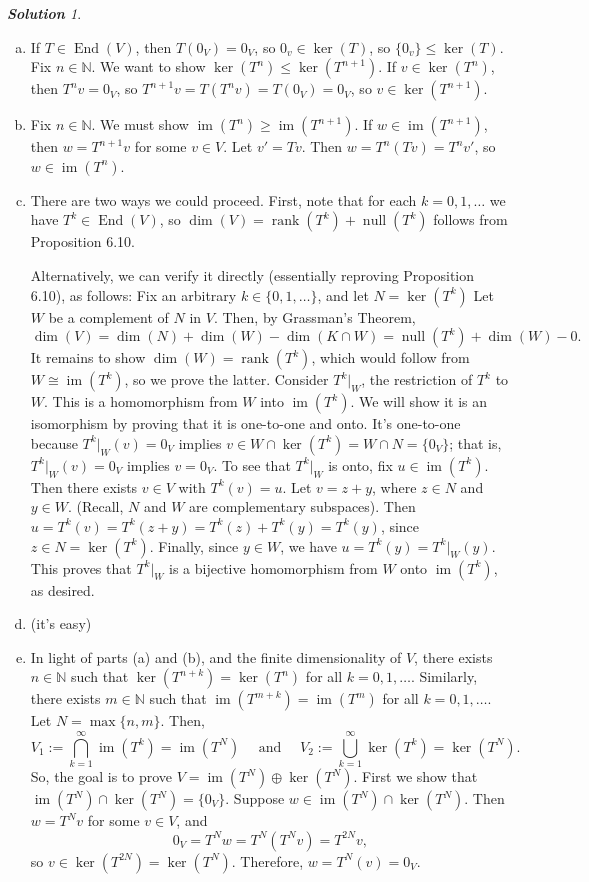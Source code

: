 \documentclass[11pt]{paper}
\theoremstyle{remark}
\newtheorem*{solution}{{\bf Solution}}
\newcommand\0{\ensuremath{\mathbf{0}}}
\newcommand{\<}{\ensuremath{\langle}}
\renewcommand{\>}{\ensuremath{\rangle}}
\newcommand\fld[1]{\ensuremath{\mathbb{#1}}}
\newcommand\N{\ensuremath{\fld{N}}}
\newcommand\End{\ensuremath{\operatorname{End}}}
\newcommand{\nulity}[1]{\ensuremath{\operatorname{null}(#1)}}
\renewcommand{\ker}[1]{\ensuremath{\operatorname{ker}(#1)}}
\renewcommand{\dim}[1]{\ensuremath{\operatorname{dim}(#1)}}
\newcommand\im[1]{\ensuremath{\operatorname{im}(#1)}}
\newcommand{\rank}[1]{\ensuremath{\operatorname{rank}(#1)}}
\renewcommand{\leq}{\ensuremath{\leqslant}}
\renewcommand{\geq}{\ensuremath{\geqslant}}
\begin{document}
\begin{solution}
  \begin{enumerate}[(a)]
  \item If $T \in \End(V)$, then $T(0_V) = 0_V$, so $0_v\in \ker{T}$, so 
    $\{0_v\}\leq \ker{T}$.  Fix $n \in \N$.  We want to show 
    $\ker{T^n} \leq \ker{T^{n+1}}$. If $v\in \ker{T^n}$, then $T^nv = 0_V$, so 
    $T^{n+1}v = T(T^nv) = T(0_V) = 0_V$, so $v\in \ker{T^{n+1}}$.
\item  Fix $n \in \N$.  We must show $\im{T^n} \geq \im{T^{n+1}}$. 
If $w \in \im{T^{n+1}}$, then $w = T^{n+1}v$ for some $v\in V$. Let $v' =  Tv$.
Then $w =  T^n (Tv) = T^nv'$, so  $w \in \im{T^n}$.

\item 
There are two ways we could proceed.
First, note that for each $k= 0, 1, \dots$ we have $T^k\in \End(V)$, so 
$\dim{V} = \rank{T^k} + \nulity{T^k}$ follows from Proposition 6.10.

Alternatively, we can verify it directly (essentially reproving
Proposition 6.10), as follows: Fix an arbitrary $k \in \{0, 1, \dots\}$, and let
$N = \ker{T^k}$  Let $W$ be a complement of $N$ in $V$.  Then, by Grassman's
Theorem,
\[
\dim{V} = \dim{N} + \dim{W}-\dim{K\cap W} = \nulity{T^k} + \dim{W} - 0.
\]
It remains to show $\dim{W} = \rank{T^k}$, which would follow from
$W \cong \im{T^k}$, so we prove the latter.  Consider $T^k|_W$, the restriction
of $T^k$ to $W$. This is a homomorphism from $W$ into $\im{T^k}$.  We will show it is an
isomorphism by proving that it is one-to-one and onto.  It's one-to-one because 
$T^k|_W(v) = 0_V$ implies $v \in W \cap \ker{T^k} =  W \cap N = \{0_V\}$;
that is, $T^k|_W(v) = 0_V$ implies $v = 0_V$. To see that $T^k|_W$ is onto, fix
$u \in \im{T^k}$. Then there exists $v\in V$ with $T^k(v) = u$.  Let $v = z+y$,
where $z \in N$ and $y\in W$. (Recall, $N$ and $W$ are complementary
subspaces). Then $u = T^k(v) = T^k(z+y) =  T^k(z)+ T^k(y) = T^k(y)$, since $z
\in N = \ker{T^k}$. Finally, since  $y\in W$, we have $u = T^k(y) = T^k|_W(y)$.
This proves that $T^k|_W$ is a bijective homomorphism from $W$ onto $\im{T^k}$,
as desired.
\item (it's easy)
\item In light of parts (a) and (b), and the finite dimensionality of $V$, there
  exists $n\in \N$ such that $\ker{T^{n+k}} = \ker{T^{n}}$ for all $k =0, 1, \dots$.
Similarly, there exists $m\in \N$ such that 
$\im{T^{m+k}} = \im{T^{m}}$ for all $k =0, 1, \dots$. Let $N = \max\{n, m\}$. Then,
\[
V_1 := \bigcap\limits_{k=1}^\infty \im{T^k}= \im{T^N} \quad \text{ and } \quad
V_2 := \bigcup\limits_{k=1}^\infty \ker{T^k}= \ker{T^N}.
\]
So, the goal is to prove 
$V = \im{T^N} \oplus \ker{T^N}$. First we show that 
$\im{T^N} \cap \ker{T^N} = \{0_V\}$. 
Suppose $w \in \im{T^N} \cap \ker{T^N}$.  Then $w = T^Nv$ for some $v\in V$,
and 
\[
0_V = T^Nw = T^N (T^Nv) = T^{2N}v,
\]
so $v \in \ker{T^{2N}} =
\ker{T^{N}}$.
Therefore, $w = T^N(v) = 0_V$. 


\end{enumerate}
\end{solution}
\end{document}
